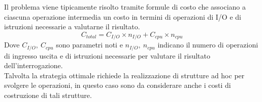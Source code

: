  Il problema viene tipicamente risolto tramite formule di costo che associano a ciascuna operazione intermedia un costo in termini di operazioni di I/O e di istruzioni necessarie a valutarne il risultato.
 $$C_{total} = C_{I/O} \times n_{I/O} + C_{cpu} \times n_{cpu}$$
 Dove $C_{I/O},\ C_{cpu}$ sono parametri noti e $n_{I/O},\ n_{cpu}$ indicano il numero di operazioni di ingresso uscita e di istruzioni necessarie per valutare il risultato dell'interrogazione.\\
 Talvolta la strategia ottimale richiede la realizzazione di strutture ad hoc per svolgere le operazioni, in questo caso sono da considerare anche i costi di costruzione di tali strutture. 